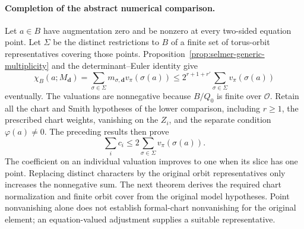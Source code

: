 \paragraph{Completion of the abstract numerical comparison.}
Let $a\in B$ have augmentation zero and be nonzero at every
two-sided equation point. Let $\Sigma$ be the distinct restrictions
to $B$ of a finite set of torus-orbit representatives covering those
points. Proposition~\ref{prop:selmer-generic-multiplicity} and the
determinant--Euler identity give
\[
 \chi_B(a;M_{\boldsymbol d})
 =\sum_{\sigma\in\Sigma}m_{\sigma,\boldsymbol d}v_\pi(\sigma(a))
 \le 2^{r+1+r'}\sum_{\sigma\in\Sigma}v_\pi(\sigma(a))
\]
eventually. The valuations are nonnegative because $B/Q_0$ is
finite over $\mathcal O$. Retain all the chart and Smith hypotheses
of the lower comparison, including $r\ge1$, the prescribed chart
weights, vanishing on the $Z_i$, and the separate condition
$\varphi(a)\ne0$. The preceding results then prove
\begin{equation}
 \sum_i c_i\le2\sum_{\sigma\in\Sigma}v_\pi(\sigma(a)).
 \label{eq:selmer-complete-abstract-core}
\end{equation}
The coefficient on an individual valuation improves to one when its
slice has one point. Replacing distinct characters by the original
orbit representatives only increases the nonnegative sum. The next
theorem derives the required chart normalization and finite orbit cover
from the original model hypotheses. Point nonvanishing alone does not
establish formal-chart nonvanishing for the original element; an
equation-valued adjustment supplies a suitable representative.
